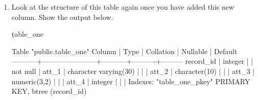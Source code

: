 \begin{enumerate}
\begin{sql}
\end{sql}
\item Look at the structure of this table again once you have added this new column. Show the output below.
\begin{sql}
\d table_one
\end{sql}
\begin{pseudo*}
                      Table "public.table_one"
  Column   |         Type          | Collation | Nullable | Default
-----------+-----------------------+-----------+----------+---------
 record_id | integer               |           | not null |
 att_1     | character varying(30) |           |          |
 att_2     | character(10)         |           |          |
 att_3     | numeric(3,2)          |           |          |
 att_4     | integer               |           |          |
Indexes:
    "table_one_pkey" PRIMARY KEY, btree (record_id)
\end{pseudo*}


\end{enumerate}
